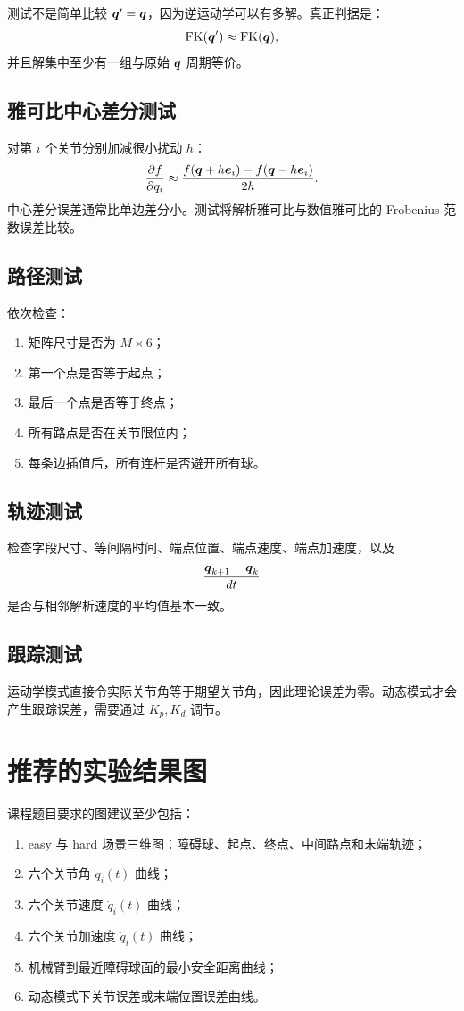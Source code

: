 测试不是简单比较 $\boldsymbol{q}'=\boldsymbol{q}$，因为逆运动学可以有多解。真正判据是：
\[
\mathrm{FK}(\boldsymbol{q}')\approx\mathrm{FK}(\boldsymbol{q}),
\]
并且解集中至少有一组与原始 $\boldsymbol{q}$ 周期等价。

\subsection{雅可比中心差分测试}

对第 $i$ 个关节分别加减很小扰动 $h$：
\[
\frac{\partial f}{\partial q_i}
\approx\frac{f(\boldsymbol{q}+h\boldsymbol{e}_i)-f(\boldsymbol{q}-h\boldsymbol{e}_i)}{2h}.
\]
中心差分误差通常比单边差分小。测试将解析雅可比与数值雅可比的 Frobenius
范数误差比较。

\subsection{路径测试}

依次检查：
\begin{enumerate}
  \item 矩阵尺寸是否为 $M\times6$；
  \item 第一个点是否等于起点；
  \item 最后一个点是否等于终点；
  \item 所有路点是否在关节限位内；
  \item 每条边插值后，所有连杆是否避开所有球。
\end{enumerate}

\subsection{轨迹测试}

检查字段尺寸、等间隔时间、端点位置、端点速度、端点加速度，以及
\[
\frac{\boldsymbol{q}_{k+1}-\boldsymbol{q}_k}{dt}
\]
是否与相邻解析速度的平均值基本一致。

\subsection{跟踪测试}

运动学模式直接令实际关节角等于期望关节角，因此理论误差为零。动态模式才会
产生跟踪误差，需要通过 $K_p,K_d$ 调节。

\section{推荐的实验结果图}

课程题目要求的图建议至少包括：
\begin{enumerate}
  \item easy 与 hard 场景三维图：障碍球、起点、终点、中间路点和末端轨迹；
  \item 六个关节角 $q_i(t)$ 曲线；
  \item 六个关节速度 $\dot q_i(t)$ 曲线；
  \item 六个关节加速度 $\ddot q_i(t)$ 曲线；
  \item 机械臂到最近障碍球面的最小安全距离曲线；
  \item 动态模式下关节误差或末端位置误差曲线。
\end{enumerate}

